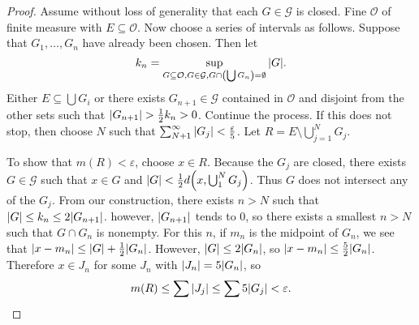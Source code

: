 \documentclass[leqno, openany]{memoir}
\theoremstyle{definition}
\theoremstyle{remark}
\theoremstyle{plain}
\theoremstyle{definition}
\theoremstyle{remark}
\newcommand{\ep}{\varepsilon}
\newcommand{\mc}[1]{\mathcal{#1}}
\begin{document}
\begin{proof}
    Assume without loss of generality that each $G \in \mc{G}$ is closed. Fine $\mc{O}$ of finite measure with $E \subseteq \mc{O}$. Now choose a series of intervals as follows. Suppose that $G_1, \ldots, G_n$ have already been chosen. Then let 
    \[ k_n = \sup_{G \subseteq \mc{O}, G \in \mc{G}, G \cap \qty(\bigcup G_n) = \emptyset} \abs{G}. \]
    Either $E \subseteq \bigcup G_i$ or there exists $G_{n+1} \in \mc{G}$ contained in $\mc{O}$ and disjoint from the other sets such that $\abs{G_{n+1}} > \frac{1}{2} k_n > 0$. Continue the process. If this does not stop, then choose $N$ such that $\sum_{N+1}^{\infty} \abs{G_j} < \frac{\ep}{5}$. Let $R = E \setminus \bigcup_{j=1}^N G_j$.

    To show that $m(R) < \ep$, choose $x \in R$. Because the $G_j$ are closed, there exists $G \in \mc{G}$ such that $x \in G$ and $\abs{G} < \frac{1}{2} d\qty(x, \bigcup_1^N G_j)$. Thus $G$ does not intersect any of the $G_j$. From our construction, there exists $n > N$ such that $\abs{G} \leq k_n \leq 2 \abs{G_{n+1}}$. however, $\abs{G_{n+1}}$ tends to $0$, so there exists a smallest $n>N$ such that $G \cap G_n$ is nonempty. For this $n$, if $m_n$ is the midpoint of $G_n$, we see that $\abs{x - m_n} \leq \abs{G} + \frac{1}{2}\abs{G_n}$. However, $\abs{G} \leq 2 \abs{G_n}$, so $\abs{x - m_n} \leq \frac{5}{2} \abs{G_n}$. Therefore $x \in J_n$ for some $J_n$ with $\abs{J_n} = 5 \abs{G_n}$, so
    \[ m(R) \leq \sum \abs{J_j} \leq \sum 5 \abs{G_j} < \ep. \qedhere \]
\end{proof}
\end{document}
